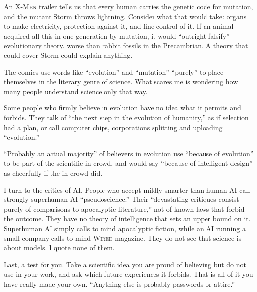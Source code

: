 
An \textsc{X-Men} trailer tells us that every human carries the genetic code for mutation, and the mutant Storm throws lightning. Consider what that would take: organs to make electricity, protection against it, and fine control of it. If an animal acquired all this in one generation by mutation, it would ``outright falsify'' evolutionary theory, worse than rabbit fossils in the Precambrian. A theory that could cover Storm could explain anything.

The comics use words like ``evolution'' and ``mutation'' ``purely'' to place themselves in the literary genre of science. What scares me is wondering how many people understand science only that way.

Some people who firmly believe in evolution have no idea what it permits and forbids. They talk of ``the next step in the evolution of humanity,'' as if selection had a plan, or call computer chips, corporations splitting and uploading ``evolution.'' 

``Probably an actual majority'' of believers in evolution use ``because of evolution'' to be part of the scientific in-crowd, and would say ``because of intelligent design'' as cheerfully if the in-crowd did. 

I turn to the critics of AI. People who accept mildly smarter-than-human AI call strongly superhuman AI ``pseudoscience.'' Their ``devastating critiques consist purely of comparisons to apocalyptic literature,'' not of known laws that forbid the outcome. They have no theory of intelligence that sets an upper bound on it. Superhuman AI simply calls to mind apocalyptic fiction, while an AI running a small company calls to mind \textsc{Wired} magazine. They do not see that science is about models. I quote none of them. 

Last, a test for you. Take a scientific idea you are proud of believing but do not use in your work, and ask which future experiences it forbids. That is all of it you have really made your own. ``Anything else is probably passwords or attire.''
